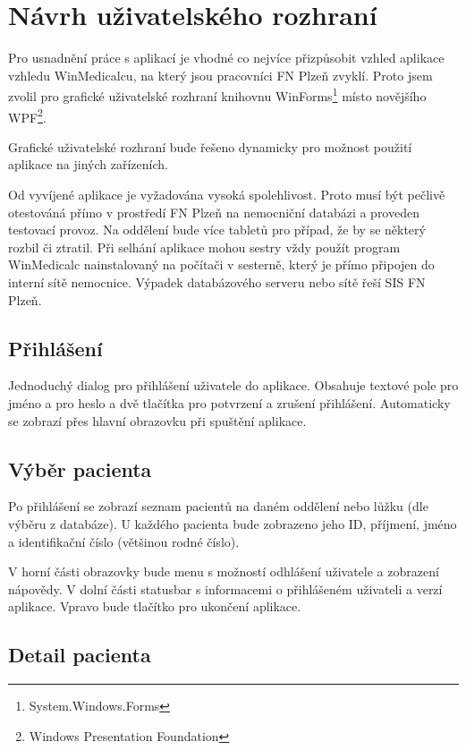 \setlength{\parskip}{1em}

\chapter{Návrh uživatelského rozhraní}

Pro usnadnění práce s aplikací je vhodné co nejvíce přizpůsobit vzhled aplikace vzhledu WinMedicalcu, na který jsou pracovníci FN Plzeň zvyklí. Proto jsem zvolil pro grafické uživatelské rozhraní knihovnu WinForms\footnote{System.Windows.Forms} místo novějšího WPF\footnote{Windows Presentation Foundation}.

Grafické uživatelské rozhraní bude řešeno dynamicky pro možnost použití aplikace na jiných zařízeních.

Od vyvíjené aplikace je vyžadována vysoká spolehlivost. Proto musí být pečlivě otestováná přímo v prostředí FN Plzeň na nemocniční databázi a proveden testovací provoz. Na oddělení bude více tabletů pro případ, že by se některý rozbil či ztratil. Při selhání aplikace mohou sestry vždy použít program WinMedicalc nainstalovaný na počítači v sesterně, který je přímo připojen do interní sítě nemocnice. Výpadek databázového serveru nebo sítě řeší SIS FN Plzeň.

\section{Přihlášení}

Jednoduchý dialog pro přihlášení uživatele do aplikace. Obsahuje textové pole pro jméno a pro heslo a dvě tlačítka pro potvrzení a zrušení přihlášení. Automaticky se zobrazí přes hlavní obrazovku při spuštění aplikace.

\section{Výběr pacienta}

Po přihlášení se zobrazí seznam pacientů na daném oddělení nebo lůžku (dle výběru z databáze). U každého pacienta bude zobrazeno jeho ID, příjmení, jméno a identifikační číslo (většinou rodné číslo).

V horní části obrazovky bude menu s možností odhlášení uživatele a zobrazení nápovědy. V dolní části statusbar s informacemi o přihlášeném uživateli a verzí aplikace. Vpravo bude tlačítko pro ukončení aplikace.

\section{Detail pacienta}

